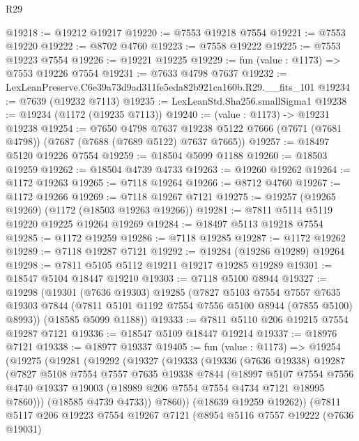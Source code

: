 \begin{lexlean}{R29}
\begin{coremodule}
@19218 := @19212 @19217
@19220 := @7553 @19218 @7554
@19221 := @7553 @19220
@19222 := @8702 @4760
@19223 := @7558 @19222
@19225 := @7553 @19223 @7554
@19226 := @19221 @19225
@19229 := fun (value : @1173) => @7553 @19226 @7554
@19231 := @7633 @4798 @7637
@19232 := LexLeanPreserve.C6e39a73d9ad311fe5eda82b921ca160b.R29.__fits_101
@19234 := @7639 (@19232 @7113)
@19235 := LexLeanStd.Sha256.smallSigma1
@19238 := @19234 (@1172 (@19235 @7113))
@19240 := (value : @1173) -> @19231 @19238
@19254 := @7650
    @4798
    @7637
    @19238
    @5122
    @7666
    (@7671 (@7681 @4798))
    (@7687 (@7688 (@7689 @5122) @7637 @7665))
@19257 := @18497 @5120 @19226 @7554
@19259 := @18504 @5099 @1188
@19260 := @18503 @19259
@19262 := @18504 @4739 @4733
@19263 := @19260 @19262
@19264 := @1172 @19263
@19265 := @7118 @19264
@19266 := @8712 @4760
@19267 := @1172 @19266
@19269 := @7118 @19267 @7121
@19275 := @19257 (@19265 @19269) (@1172 (@18503 @19263 @19266))
@19281 := @7811 @5114 @5119 @19220 @19225 @19264 @19269
@19284 := @18497 @5113 @19218 @7554
@19285 := @1172 @19259
@19286 := @7118 @19285
@19287 := @1172 @19262
@19289 := @7118 @19287 @7121
@19292 := @19284 (@19286 @19289) @19264
@19298 := @7811 @5105 @5112 @19211 @19217 @19285 @19289
@19301 := @18547 @5104 @18447 @19210
@19303 := @7118 @5100 @8944
@19327 := @19298
    (@19301
      (@7636 @19303)
      @19285
      (@7827
        @5103
        @7554
        @7557
        @7635
        @19303
        @7844
        (@7811 @5101 @1192 @7554 @7556 @5100 @8944 (@7855 @5100) @8993))
      (@18585 @5099 @1188))
@19333 := @7811 @5110 @206 @19215 @7554 @19287 @7121
@19336 := @18547 @5109 @18447 @19214
@19337 := @18976 @7121
@19338 := @18977 @19337
@19405 := fun (value : @1173) =>
  @19254
    (@19275
      (@19281
        (@19292
          (@19327
            (@19333
              (@19336
                (@7636 @19338)
                @19287
                (@7827
                  @5108
                  @7554
                  @7557
                  @7635
                  @19338
                  @7844
                  (@18997
                    @5107
                    @7554
                    @7556
                    @4740
                    @19337
                    @19003
                    (@18989 @206 @7554 @7554 @4734 @7121 @18995 @7860)))
                (@18585 @4739 @4733))
              @7860))
          (@18639 @19259 @19262))
        (@7811
          @5117
          @206
          @19223
          @7554
          @19267
          @7121
          (@8954
            @5116
            @7557
            @19222
            (@7636 @19031)

\end{coremodule}
\end{lexlean}
